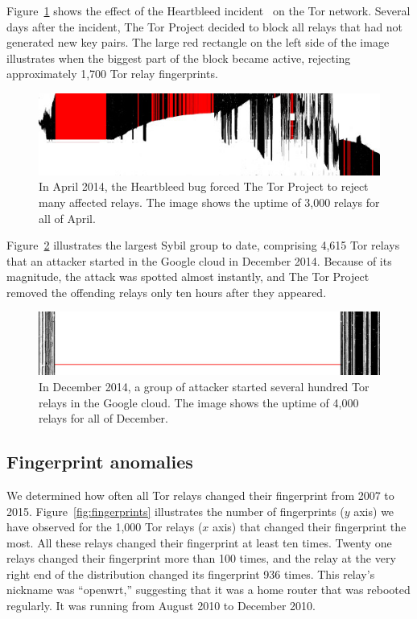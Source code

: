 Figure~\ref{fig:2014-04-heartbleed} shows the effect of the Heartbleed
incident~\cite{Durumeric2014a} on the Tor network.  Several days after the
incident, The Tor Project decided to block all relays that had not generated new
key pairs.  The large red rectangle on the left side of the image illustrates
when the biggest part of the block became active, rejecting approximately 1,700
Tor relay fingerprints.

\begin{figure}[t]
	\centering
	\includegraphics[width=\linewidth]{diagrams/2014-04.jpg}
	\caption{In April 2014, the Heartbleed bug forced The Tor Project to reject
	many affected relays.  The image shows the uptime of 3,000 relays for all of
	April.}
	\label{fig:2014-04-heartbleed}
\end{figure}

Figure~\ref{fig:2014-12-lizard} illustrates the largest Sybil group to date,
comprising 4,615 Tor relays that an attacker started in the Google cloud in
December 2014.  Because of its magnitude, the attack was spotted almost
instantly, and The Tor Project removed the offending relays only ten hours
after they appeared.

\begin{figure}[t]
	\centering
	\includegraphics[width=\linewidth]{diagrams/2014-12.jpg}
	\caption{In December 2014, a group of attacker started several hundred Tor
		relays in the Google cloud.  The image shows the uptime of 4,000 relays
		for all of December.}
	\label{fig:2014-12-lizard}
\end{figure}

\subsection{Fingerprint anomalies}
\label{sec:fingerprints}
We determined how often all Tor relays changed their fingerprint from 2007 to
2015.  Figure~\ref{fig:fingerprints} illustrates the number of fingerprints ($y$
axis) we have observed for the 1,000 Tor relays ($x$ axis) that changed their
fingerprint the most.  All these relays changed their fingerprint at least ten
times.  Twenty one relays changed their fingerprint more than 100 times, and the
relay at the very right end of the distribution changed its fingerprint 936
times.  This relay's nickname was ``openwrt,'' suggesting that it was a home
router that was rebooted regularly.  It was running from August 2010 to December
2010.

